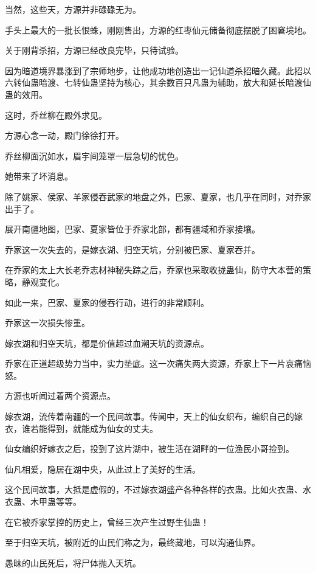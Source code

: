 
\begin{this_body}

当然，这些天，方源并非碌碌无为。

手头上最大的一批长恨蛛，刚刚售出，方源的红枣仙元储备彻底摆脱了困窘境地。

关于刚背杀招，方源已经改良完毕，只待试验。

因为暗道境界暴涨到了宗师地步，让他成功地创造出一记仙道杀招暗久藏。此招以六转仙蛊暗渡、七转仙蛊坚持为核心，其余数百只凡蛊为辅助，放大和延长暗渡仙蛊的效用。

这时，乔丝柳在殿外求见。

方源心念一动，殿门徐徐打开。

乔丝柳面沉如水，眉宇间笼罩一层急切的忧色。

她带来了坏消息。

除了姚家、侯家、羊家侵吞武家的地盘之外，巴家、夏家，也几乎在同时，对乔家出手了。

展开南疆地图，巴家、夏家皆位于乔家北部，都有疆域和乔家接壤。

乔家这一次失去的，是嫁衣湖、归空天坑，分别被巴家、夏家吞并。

在乔家的太上大长老乔志材神秘失踪之后，乔家也采取收拢蛊仙，防守大本营的策略，静观变化。

如此一来，巴家、夏家的侵吞行动，进行的非常顺利。

乔家这一次损失惨重。

嫁衣湖和归空天坑，都是价值超过血潮天坑的资源点。

乔家在正道超级势力当中，实力垫底。这一次痛失两大资源，乔家上下一片哀痛恼怒。

方源也听闻过着两个资源点。

嫁衣湖，流传着南疆的一个民间故事。传闻中，天上的仙女织布，编织自己的嫁衣，谁若能得到，就能成为仙女的丈夫。

仙女编织好嫁衣之后，投到了这片湖中，被生活在湖畔的一位渔民小哥捡到。

仙凡相爱，隐居在湖中央，从此过上了美好的生活。

这个民间故事，大抵是虚假的，不过嫁衣湖盛产各种各样的衣蛊。比如火衣蛊、水衣蛊、木甲蛊等等。

在它被乔家掌控的历史上，曾经三次产生过野生仙蛊！

至于归空天坑，被附近的山民们称之为，最终藏地，可以沟通仙界。

愚昧的山民死后，将尸体抛入天坑。


\end{this_body}
